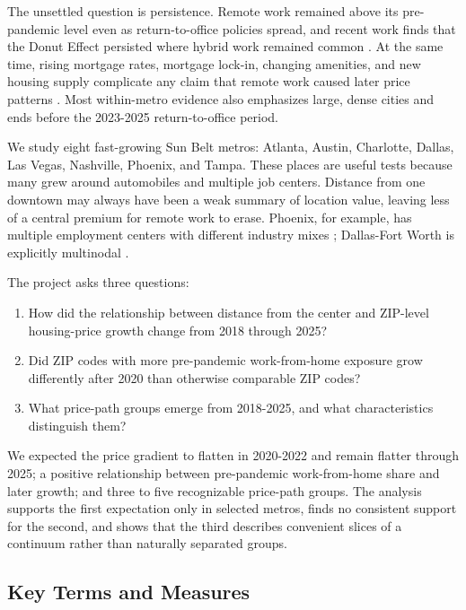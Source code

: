 \documentclass[11pt]{article}
\begin{document}
The unsettled question is persistence. Remote work remained above its pre-pandemic level even as return-to-office policies spread,
and recent work finds that the Donut Effect persisted where hybrid work remained common \cite{barrero2023evolution,ramani2024reshapes}.
At the same time, rising mortgage rates, mortgage lock-in, changing amenities, and new housing supply complicate any claim that
remote work caused later price patterns \cite{howard2023short,fonseca2024mortgage}. Most within-metro evidence also emphasizes
large, dense cities and ends before the 2023-2025 return-to-office period.

We study eight fast-growing Sun Belt metros: Atlanta, Austin, Charlotte, Dallas, Las
Vegas, Nashville, Phoenix, and Tampa. These places are useful tests because many grew around automobiles and multiple job centers.
Distance from one downtown may always have
been a weak summary of location value, leaving less of a central premium for remote work to erase. Phoenix, for example, has
multiple employment centers with different industry mixes \cite{leslie2010identification}; Dallas-Fort Worth is explicitly
multinodal \cite{waddell1993residential}.

The project asks three questions:
\begin{enumerate}
\item How did the relationship between distance from the center and ZIP-level housing-price growth change from 2018 through 2025?\par
\item Did ZIP codes with more pre-pandemic work-from-home exposure grow differently after 2020 than otherwise comparable ZIP codes?\par
\item What price-path groups emerge from 2018-2025, and what characteristics distinguish them?\par
\end{enumerate}
We expected the price gradient to flatten in 2020-2022 and remain flatter through 2025; a positive relationship between
pre-pandemic work-from-home share and later growth; and three to five recognizable price-path groups. The analysis supports the
first expectation only in selected metros, finds no consistent support for the second, and shows that the third describes convenient
slices of a continuum rather than naturally separated groups.

\subsection*{Key Terms and Measures}
\end{document}
